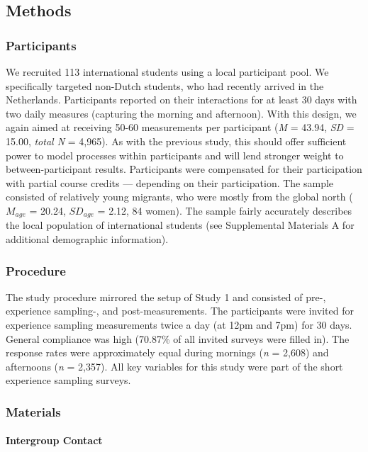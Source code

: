 \subsection{Methods}

\subsubsection{Participants}

We recruited 113 international students using a local participant pool.
We specifically targeted non-Dutch students, who had recently arrived in
the Netherlands. Participants reported on their interactions for at
least 30 days with two daily measures (capturing the morning and
afternoon). With this design, we again aimed at receiving 50-60
measurements per participant (\textit{M} = 43.94, \textit{SD} = 15.00,
\textit{total N} = 4,965). As with the previous study, this should offer
sufficient power to model processes within participants and will lend
stronger weight to between-participant results. Participants were
compensated for their participation with partial course credits ---
depending on their participation. The sample consisted of relatively
young migrants, who were mostly from the global north (\(M_{age}\) =
20.24, \(SD_{age}\) = 2.12, 84 women). The sample fairly accurately
describes the local population of international students (see
Supplemental Materials A for additional demographic information).

\subsubsection{Procedure}

The study procedure mirrored the setup of Study 1 and consisted of pre-,
experience sampling-, and post-measurements. The participants were
invited for experience sampling measurements twice a day (at 12pm and
7pm) for 30 days. General compliance was high (70.87\% of all invited
surveys were filled in). The response rates were approximately equal
during mornings (\textit{n} = 2,608) and afternoons (\textit{n} =
2,357). All key variables for this study were part of the short
experience sampling surveys.

\subsubsection{Materials}

\paragraph{Intergroup Contact}

